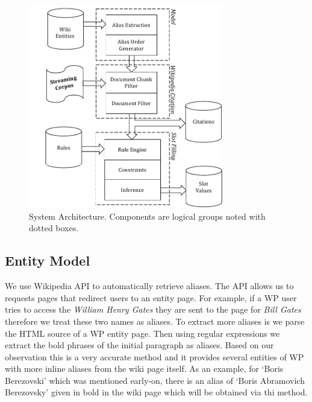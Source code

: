 \begin{figure}
\hspace{-10mm}
  \centering
  \includegraphics[width=8.5cm]{./images/System_Diagram_with_model_Vertical-crop.pdf}
  \vspace*{-.1in} 
  \caption{System Architecture.
  Components are logical groups noted with dotted boxes.}
  \label{fig:system}
  \vspace*{-.2in}
\end{figure}



\subsection{Entity Model}

We use Wikipedia API to automatically retrieve aliases. 
The API allows us to requests pages that redirect users to an entity page.
For example, if a WP user tries to access the \textsl{William Henry Gates} they are sent to the page for 
\textsl{Bill Gates} therefore we treat these two names as aliases. 
To extract more aliases  is we parse the HTML source of a WP entity page.
Then using regular expressions we extract the bold phrases of the initial paragraph as aliases.
Based on our observation this is a very accurate method and it provides several entities of 
WP with more inline aliases from the wiki page itself. As an example, for `Boris Berezovski' which was mentioned early-on, there is an alias of `Boris Abramovich Berezovsky' given in bold in the wiki page which will be obtained via thi method.


